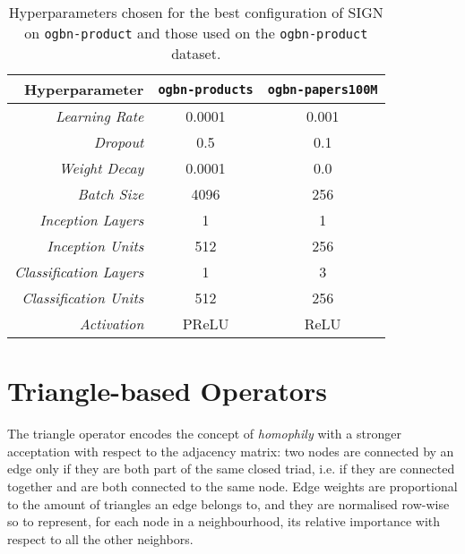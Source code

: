 \documentclass{article}
\begin{document}
\begin{table*}[h!]
    \caption{Hyperparameters chosen for the best configuration of SIGN on \texttt{ogbn-product} and those used on the \texttt{ogbn-product} dataset.}
    \label{tab:hyperparameter_tuned_ogb}
    \vskip 0.15in
    \begin{center}
    \begin{small}
    \begin{sc}
    \begin{tabular}{| r | c | c |}
    \hline
    Hyperparameter & \texttt{ogbn-products} & \texttt{ogbn-papers100M} \\
    \hline
    \textit{Learning Rate}
        & 0.0001
        & 0.001 \\
    \textit{Dropout}
        & 0.5
        & 0.1 \\
    \textit{Weight Decay}
        & 0.0001
        & 0.0 \\
    \textit{Batch Size}
        & 4096
        & 256 \\
    \textit{Inception Layers}
        & 1
        & 1 \\
    \textit{Inception Units}
        & 512
        & 256 \\
    \textit{Classification Layers}
        & 1
        & 3 \\
    \textit{Classification Units}
        & 512 
        & 256 \\
    \textit{Activation}
        & PReLU
        & ReLU \\
    \hline
    \end{tabular}
    \end{sc}
    \end{small}
    \end{center}
    \vskip -0.1in
\end{table*}

\section{Triangle-based Operators}

The triangle operator encodes the concept of \emph{homophily} with a stronger acceptation with respect to the adjacency matrix: two nodes are connected by an edge only if they are both part of the same closed triad, i.e. if they are connected together and are both connected to the same node. Edge weights are proportional to the amount of triangles an edge belongs to, and they are normalised row-wise so to represent, for each node in a neighbourhood, its relative importance with respect to all the other neighbors.
\end{document}
